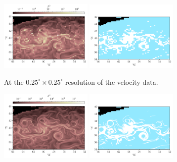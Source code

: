 \begin{figure}
	\centering
	\begin{subfigure}{\textwidth}
		\includegraphics[width=0.49\textwidth]{chp06_applications/figures/gulf_stream/S2_field_grid}
		\includegraphics[width=0.49\textwidth]{chp06_applications/figures/gulf_stream/S2_robust_grid_2.0}
		\caption{At the \(0.25^\circ \times 0.25^\circ\) resolution of the velocity data.}
		\label{fig:na_s2_grid}
	\end{subfigure}
	\begin{subfigure}{\textwidth}
		\includegraphics[width=0.49\textwidth]{chp06_applications/figures/gulf_stream/S2_field_high}
		\includegraphics[width=0.49\textwidth]{chp06_applications/figures/gulf_stream/S2_robust_high_2.0}

\end{subfigure}
\end{figure}

